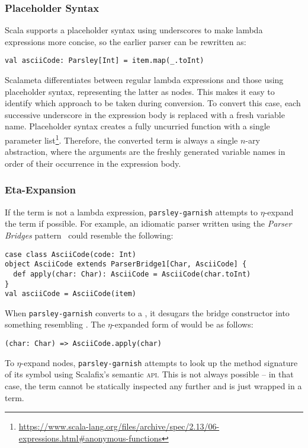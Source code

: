\documentclass[../../../main.tex]{subfiles}
\begin{document}
\subsubsection{Placeholder Syntax}
Scala supports a placeholder syntax using underscores to make lambda expressions more concise, so the earlier parser can be rewritten as:
\begin{verbatim}
val asciiCode: Parsley[Int] = item.map(_.toInt)
\end{verbatim}
%
Scalameta differentiates between regular lambda expressions and those using placeholder syntax, representing the latter as  nodes.
This makes it easy to identify which approach to be taken during conversion.
To convert this case, each successive underscore in the expression body is replaced with a fresh variable name.
Placeholder syntax creates a fully uncurried function with a single parameter list\footnote{\url{https://www.scala-lang.org/files/archive/spec/2.13/06-expressions.html#anonymous-functions}}.
Therefore, the converted  term is always a single $n$-ary abstraction, where the arguments are the freshly generated variable names in order of their occurrence in the expression body.

\subsubsection{Eta-Expansion}
If the term is not a lambda expression, \texttt{parsley-garnish} attempts to $\eta$-expand the term if possible.
For example, an idiomatic parser written using the \emph{Parser Bridges} pattern~\cite{willis_design_2022} could resemble the following:
\begin{verbatim}
case class AsciiCode(code: Int)
object AsciiCode extends ParserBridge1[Char, AsciiCode] {
  def apply(char: Char): AsciiCode = AsciiCode(char.toInt)
}
val asciiCode = AsciiCode(item)
\end{verbatim}
%
When \texttt{parsley-garnish} converts  to a , it desugars the bridge constructor into something resembling .
The $\eta$-expanded form of  would be as follows:
\begin{verbatim}
(char: Char) => AsciiCode.apply(char)
\end{verbatim}
%
To $\eta$-expand  nodes, \texttt{parsley-garnish} attempts to look up the method signature of its symbol using Scalafix's semantic \textsc{api}.
This is not always possible -- in that case, the term cannot be statically inspected any further and is just wrapped in a  term.
\end{document}

